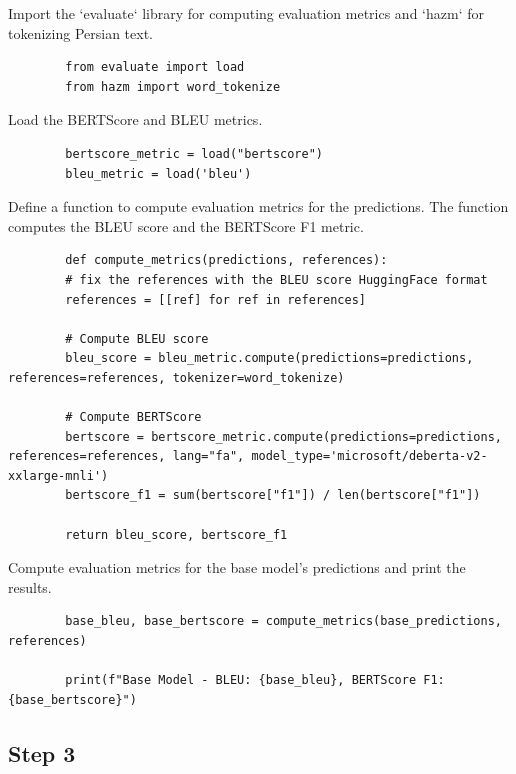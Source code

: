 \documentclass{solutionclass} %
\begin{document}
\begin{solution}
	Import the `evaluate` library for computing evaluation metrics and `hazm` for tokenizing Persian text.
	\begin{lstlisting}
		from evaluate import load
		from hazm import word_tokenize
	\end{lstlisting}
\end{solution}

\begin{solution}
	Load the BERTScore and BLEU metrics.
	\begin{lstlisting}
		bertscore_metric = load("bertscore")
		bleu_metric = load('bleu')
	\end{lstlisting}
\end{solution}

\begin{solution}
	Define a function to compute evaluation metrics for the predictions. The function computes the BLEU score and the BERTScore F1 metric.
	\begin{lstlisting}
		def compute_metrics(predictions, references):
		# fix the references with the BLEU score HuggingFace format
		references = [[ref] for ref in references]
		
		# Compute BLEU score
		bleu_score = bleu_metric.compute(predictions=predictions, references=references, tokenizer=word_tokenize)
		
		# Compute BERTScore
		bertscore = bertscore_metric.compute(predictions=predictions, references=references, lang="fa", model_type='microsoft/deberta-v2-xxlarge-mnli')
		bertscore_f1 = sum(bertscore["f1"]) / len(bertscore["f1"])
		
		return bleu_score, bertscore_f1
	\end{lstlisting}
\end{solution}

\begin{solution}
	Compute evaluation metrics for the base model's predictions and print the results.
	\begin{lstlisting}
		base_bleu, base_bertscore = compute_metrics(base_predictions, references)
		
		print(f"Base Model - BLEU: {base_bleu}, BERTScore F1: {base_bertscore}")
	\end{lstlisting}
\end{solution}


\subsection*{Step 3}
\end{document}
